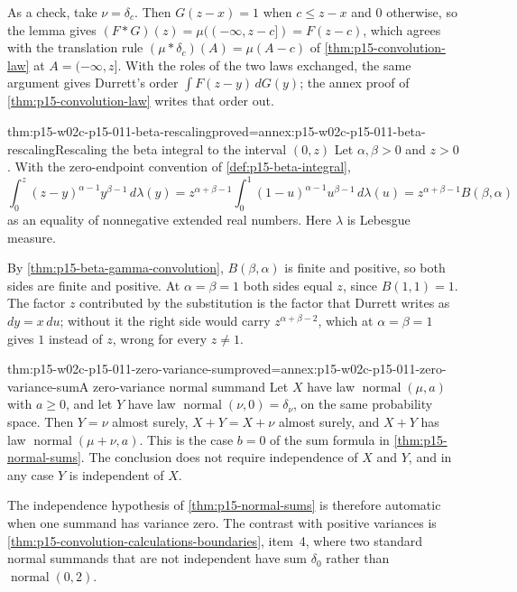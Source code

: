 As a check, take \(\nu=\delta_c\). Then \(G(z-x)=1\) when \(c\leq z-x\)
and \(0\) otherwise, so the lemma gives
\((F*G)(z)=\mu((-\infty,z-c])=F(z-c)\), which agrees with the translation
rule \((\mu*\delta_c)(A)=\mu(A-c)\) of \cref{thm:p15-convolution-law} at
\(A=(-\infty,z]\). With the roles of the two laws exchanged, the same
argument gives Durrett's order \(\int F(z-y)\,dG(y)\); the annex proof of
\cref{thm:p15-convolution-law} writes that order out.

\begin{hblemma}{thm:p15-w02c-p15-011-beta-rescaling}{proved=annex:p15-w02c-p15-011-beta-rescaling}{Rescaling the beta integral to the interval \((0,z)\)}
Let \(\alpha,\beta>0\) and \(z>0\). With the zero-endpoint convention of
\cref{def:p15-beta-integral},
\[
 \int_0^z(z-y)^{\alpha-1}y^{\beta-1}\,d\lambda(y)
  =z^{\alpha+\beta-1}\int_0^1(1-u)^{\alpha-1}u^{\beta-1}\,d\lambda(u)
  =z^{\alpha+\beta-1}B(\beta,\alpha)
\]
as an equality of nonnegative extended real numbers. Here \(\lambda\) is
Lebesgue measure.
\end{hblemma}

By \cref{thm:p15-beta-gamma-convolution}, \(B(\beta,\alpha)\) is finite and
positive, so both sides are finite and positive. At \(\alpha=\beta=1\) both
sides equal \(z\), since \(B(1,1)=1\). The factor \(z\) contributed by the
substitution is the factor that Durrett writes as \(dy=x\,du\); without it the
right side would carry \(z^{\alpha+\beta-2}\), which at \(\alpha=\beta=1\)
gives \(1\) instead of \(z\), wrong for every \(z\neq1\).

\begin{hblemma}{thm:p15-w02c-p15-011-zero-variance-sum}{proved=annex:p15-w02c-p15-011-zero-variance-sum}{A zero-variance normal summand}
Let \(X\) have law \(\operatorname{normal}(\mu,a)\) with \(a\geq0\), and let
\(Y\) have law \(\operatorname{normal}(\nu,0)=\delta_\nu\), on the same
probability space. Then \(Y=\nu\) almost surely, \(X+Y=X+\nu\) almost surely,
and \(X+Y\) has law \(\operatorname{normal}(\mu+\nu,a)\). This is the case
\(b=0\) of the sum formula in \cref{thm:p15-normal-sums}. The conclusion
does not require independence of \(X\) and \(Y\), and in any case \(Y\) is
independent of \(X\).
\end{hblemma}

The independence hypothesis of \cref{thm:p15-normal-sums} is therefore
automatic when one summand has variance zero. The contrast with positive variances is
\cref{thm:p15-convolution-calculations-boundaries}, item~4, where two standard
normal summands that are not independent have sum \(\delta_0\) rather than
\(\operatorname{normal}(0,2)\).
